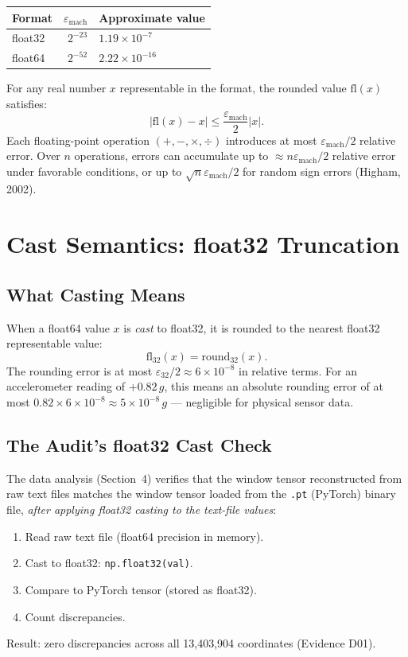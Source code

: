 \documentclass[11pt, a4paper]{article}
\theoremstyle{definition}
\theoremstyle{plain}
\newcommand{\code}[1]{\texttt{#1}}
\newcommand{\eps}{\varepsilon}
\begin{document}
\begin{center}
\small
\begin{tabular}{@{}lrl@{}}
\toprule
Format & $\eps_{\text{mach}}$ & Approximate value \\
\midrule
float32 & $2^{-23}$ & $1.19 \times 10^{-7}$ \\
float64 & $2^{-52}$ & $2.22 \times 10^{-16}$ \\
\bottomrule
\end{tabular}
\end{center}

For any real number $x$ representable in the format, the rounded value $\text{fl}(x)$
satisfies:
\[
  |\text{fl}(x) - x| \le \frac{\eps_{\text{mach}}}{2} |x|.
\]
Each floating-point operation $(+, -, \times, \div)$ introduces at most
$\eps_{\text{mach}}/2$ relative error. Over $n$ operations, errors can accumulate
up to $\approx n \eps_{\text{mach}}/2$ relative error under favorable conditions,
or up to $\sqrt{n} \eps_{\text{mach}}/2$ for random sign errors (Higham, 2002).

\section{Cast Semantics: float32 Truncation}

\subsection{What Casting Means}

When a float64 value $x$ is \emph{cast} to float32, it is rounded to the nearest
float32 representable value:
\[
  \text{fl}_{32}(x) = \text{round}_{32}(x).
\]
The rounding error is at most $\eps_{32}/2 \approx 6 \times 10^{-8}$ in relative terms.
For an accelerometer reading of $+0.82\,g$, this means an absolute rounding error of
at most $0.82 \times 6 \times 10^{-8} \approx 5 \times 10^{-8}\,g$ — negligible for
physical sensor data.

\subsection{The Audit's float32 Cast Check}

The data analysis (Section~4) verifies that the window tensor reconstructed from
raw text files matches the window tensor loaded from the \code{.pt} (PyTorch)
binary file, \emph{after applying float32 casting to the text-file values}:
\begin{enumerate}[leftmargin=1.5em]
  \item Read raw text file (float64 precision in memory).
  \item Cast to float32: \code{np.float32(val)}.
  \item Compare to PyTorch tensor (stored as float32).
  \item Count discrepancies.
\end{enumerate}
Result: zero discrepancies across all 13,403,904 coordinates (Evidence D01).
\end{document}
